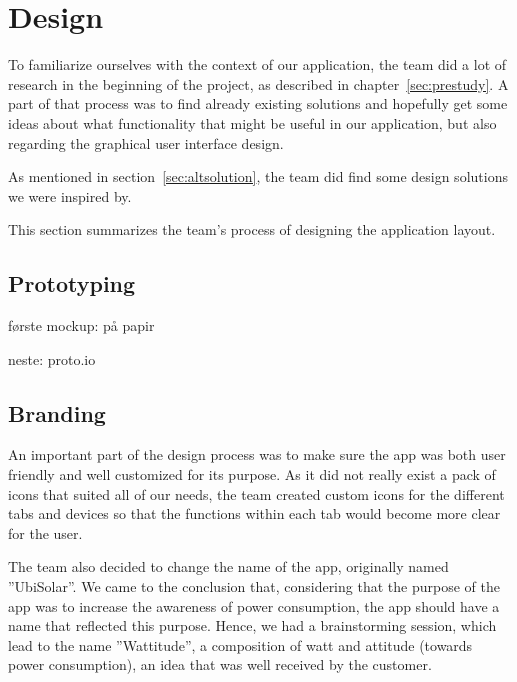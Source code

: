 \section{Design}
To familiarize ourselves with the context of our application, the team did a lot of research in the beginning of the project, as described in chapter~\ref{sec:prestudy}. A part of that process was to find already existing solutions and hopefully get some ideas about what functionality that might be useful in our application, but also regarding the graphical user interface design.

As mentioned in section~\ref{sec:altsolution}, the team did find some design solutions we were inspired by.

This section summarizes the team's process of designing the application layout.



\subsection{Prototyping}
første mockup:
på papir

neste:
proto.io

\subsection{Branding}
An important part of the design process was to make sure the app was both user friendly and well customized for its purpose. As it did not really exist a pack of icons that suited all of our needs, the team created custom icons for the different tabs and devices so that the functions within each tab would become more clear for the user.

The team also decided to change the name of the app, originally named ''UbiSolar''. We came to the conclusion that, considering that the purpose of the app was to increase the awareness of power consumption, the app should have a name that reflected this purpose. Hence, we had a brainstorming session, which lead to the name ''Wattitude'', a composition of watt and attitude (towards power consumption), an idea that was well received by the customer.


